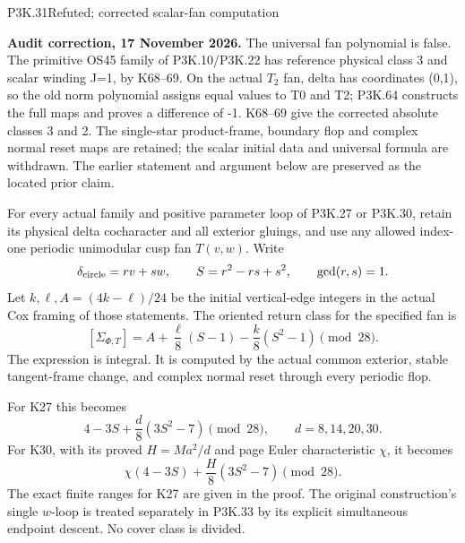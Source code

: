 \begin{statement}{P3K.31}{Refuted; corrected scalar-fan computation}
\par\noindent\textbf{Audit correction, 17 November 2026.} The universal fan polynomial is false. The primitive OS45 family of P3K.10/P3K.22 has reference physical class 3 and scalar winding J=1, by K68--69. On the actual \(T_2\) fan, delta has coordinates (0,1), so the old norm polynomial assigns equal values to T0 and T2; P3K.64 constructs the full maps and proves a difference of -1. K68--69 give the corrected absolute classes 3 and 2. The single-star product-frame, boundary flop and complex normal reset maps are retained; the scalar initial data and universal formula are withdrawn. The earlier statement and argument below are preserved as the located prior claim.
\medskip

For every actual family and positive parameter loop of P3K.27 or
P3K.30, retain its physical delta cocharacter and all exterior
gluings, and use any allowed index-one periodic unimodular cusp
fan \(T(v,w)\). Write
\[
 \delta_{\rm circle}=r v+s w,\qquad
 S=r^2-rs+s^2,\qquad \gcd(r,s)=1.
\]
Let \(k,\ell,A=(4k-\ell)/24\) be the initial vertical-edge
integers in the actual Cox framing of those statements.
The oriented return class for the specified fan is
\[
 [\Sigma_{\Phi,T}]
    =A+\frac{\ell}{8}(S-1)-\frac{k}{8}(S^2-1)
        \pmod{28}.                                      \tag{P3K.31.0}
\]
The expression is integral. It is computed by the actual common
exterior, stable tangent-frame change, and complex normal reset
through every periodic flop.

For K27 this becomes
\[
           4-3S+\frac d8(3S^2-7)\pmod{28},
       \qquad d=8,14,20,30.
\]
For K30, with its proved \(H=Ma^2/d\) and page Euler characteristic
\(\chi\), it becomes
\[
                 \chi(4-3S)+\frac H8(3S^2-7)\pmod{28}.
\]
The exact finite ranges for K27 are given in the proof.
 The original construction's single \(w\)-loop is treated separately
 in P3K.33 by its explicit simultaneous endpoint descent. No cover
 class is divided.
\end{statement}
